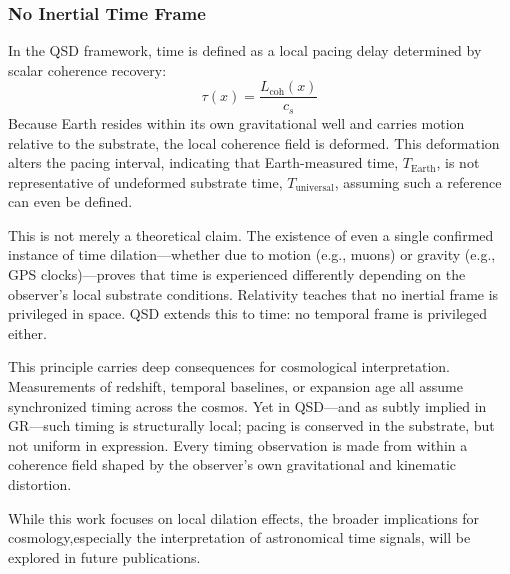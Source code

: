 \documentclass[entropy,article,submit,pdftex,moreauthors]{Definitions/mdpi}
\begin{document}
\subsubsection{No Inertial Time Frame}

In the QSD framework, time is defined as a local pacing delay determined by scalar coherence recovery:
\[
\tau(x) = \frac{L_{\text{coh}}(x)}{c_s}
\]
Because Earth resides within its own gravitational well and carries motion relative to the substrate, the local coherence field is deformed. This deformation alters the pacing interval, indicating that Earth-measured time, \( T_{\text{Earth}} \), is not representative of undeformed substrate time, \( T_{\text{universal}} \), assuming such a reference can even be defined.

This is not merely a theoretical claim. The existence of even a single confirmed instance of time dilation—whether due to motion (e.g., muons) or gravity (e.g., GPS clocks)—proves that time is experienced differently depending on the observer’s local substrate conditions. Relativity teaches that no inertial frame is privileged in space. QSD extends this to time: no temporal frame is privileged either.

This principle carries deep consequences for cosmological interpretation. Measurements of redshift, temporal baselines, or expansion age all assume synchronized timing across the cosmos. Yet in QSD—and as subtly implied in GR—such timing is structurally local; pacing is conserved in the substrate, but not uniform in expression. Every timing observation is made from within a coherence field shaped by the observer’s own gravitational and kinematic distortion.

While this work focuses on local dilation effects, the broader implications for cosmology,especially the interpretation of astronomical time signals, will be explored in future publications.
\end{document}
